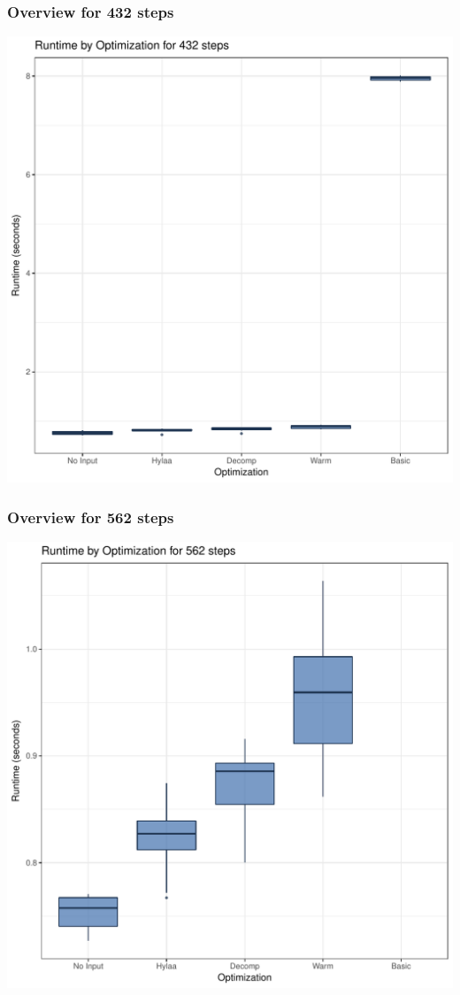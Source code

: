 \documentclass{article}\usepackage[]{graphicx}\usepackage[]{color}
\makeatletter
\def\maxwidth{ %
  \ifdim\Gin@nat@width>\linewidth
    \linewidth
  \else
    \Gin@nat@width
  \fi
}
\newenvironment{knitrout}{}{} %
\makeatother
\begin{document}
\subsubsection{Overview for 432 steps}
\begin{knitrout}
\color{fgcolor}
\includegraphics[width=\maxwidth]{figure/steps432-1} 

\end{knitrout}
\subsubsection{Overview for 562 steps}
\begin{knitrout}
\color{fgcolor}
\includegraphics[width=\maxwidth]{figure/steps562-1} 

\end{knitrout}
\end{document}
